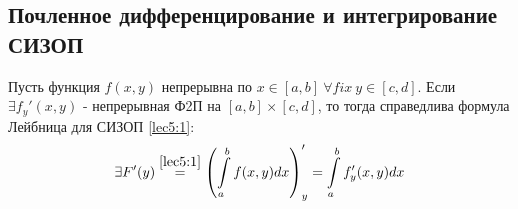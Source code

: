 \documentclass[../../main.tex]{subfiles}
\begin{document}
\subsection{Почленное дифференцирование и интегрирование СИЗОП}

\begin{thm}
	Пусть функция $ f(x, y) $ непрерывна по $ x \in [a, b]\ 
	\forall fix\ y \in [c, d] $. Если $ \exists f_y'(x, y) $ -
	непрерывная Ф2П на $ [a, b] \times [c, d] $, то тогда справедлива формула
	Лейбница для СИЗОП \eqref{lec5:1}:
	\begin{equation}
		\label{lec6:8}
		\exists F'(y) \stackrel{\eqref{lec5:1}}{=} \left(
		\int\limits_a^b f(x, y) dx
		\right)_y' = \int\limits_a^b f_y'(x, y)dx
	\end{equation}
\end{thm}
\end{document}
